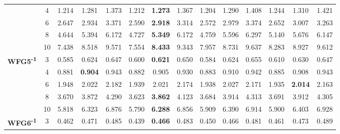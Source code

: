 \documentclass[onecolumn,10pt]{asme2ej}
\begin{document}
\begin{table}[!htb]
\begin{tabular}{|c|c|c|c|c|c|c|c|c|c|c|c|c|c|}
		& 4          & 1.214         & 1.281          & 1.373          & 1.212         & \textbf{1.273}  & 1.367          & 1.204         & 1.290          & 1.408          & 1.244         & 1.310          & 1.421          \\ \cline{2-14} 
		& 6          & 2.647         & 2.934          & 3.371          & 2.590         & \textbf{2.918}  & 3.314          & 2.572         & 2.979          & 3.374          & 2.652         & 3.007          & 3.263          \\ \cline{2-14} 
		& 8          & 4.644         & 5.394          & 6.172          & 4.727         & \textbf{5.349}  & 6.172          & 4.759         & 5.596          & 6.297          & 5.140         & 5.676          & 6.147          \\ \cline{2-14} 
		& 10         & 7.438         & 8.518          & 9.571          & 7.554         & \textbf{8.433}  & 9.343          & 7.957         & 8.731          & 9.637          & 8.283         & 8.927          & 9.612          \\ \hline
		\multirow{5}{*}{\textbf{WFG5\textsuperscript{-1}}} & 3          & 0.585         & 0.624          & 0.647          & 0.600         & \textbf{0.621}  & 0.650          & 0.584         & 0.624          & 0.655          & 0.610         & 0.630          & 0.647          \\ \cline{2-14} 
		& 4          & 0.881         & \textbf{0.904} & 0.943          & 0.882         & 0.905           & 0.930          & 0.883         & 0.910          & 0.942          & 0.885         & 0.908          & 0.943          \\ \cline{2-14} 
		& 6          & 1.948         & 2.022          & 2.182          & 1.939         & 2.021           & 2.174          & 1.938         & 2.027          & 2.171          & 1.935         & \textbf{2.014} & 2.163          \\ \cline{2-14} 
		& 8          & 3.670         & 3.872          & 4.290          & 3.623         & \textbf{3.862}  & 4.123          & 3.684         & 3.914          & 4.313          & 3.691         & 3.912          & 4.305          \\ \cline{2-14} 
		& 10         & 5.818         & 6.323          & 6.876          & 5.790         & \textbf{6.288}  & 6.856          & 5.909         & 6.390          & 6.914          & 5.900         & 6.403          & 6.928          \\ \hline
		\multirow{5}{*}{\textbf{WFG6\textsuperscript{-1}}} & 3          & 0.462         & 0.471          & 0.485          & 0.439         & \textbf{0.466}  & 0.483          & 0.450         & 0.466          & 0.481          & 0.461         & 0.473          & 0.489          \\ \cline{2-14} 

\end{tabular}
\end{table}
\end{document}
